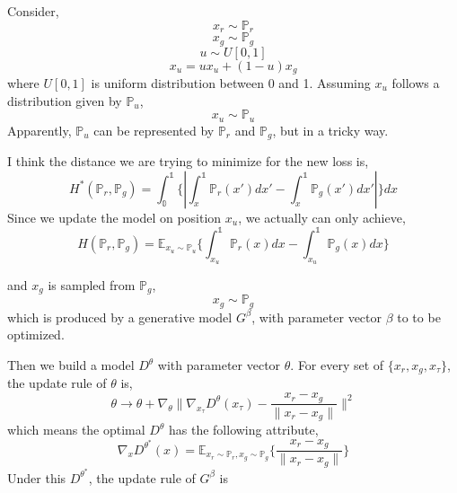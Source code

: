 \documentclass[letterpaper]{article} %
\begin{document}
Consider,
\begin{equation}\label{x-r}
   x_{r} \sim \mathbb{P}_{r}
\end{equation}
\begin{equation}\label{x-g}
  x_{g} \sim \mathbb{P}_{g}
\end{equation}
\begin{equation}\label{epsilon}
  u \sim U[0,1]
\end{equation}
\begin{equation}\label{x-epsilon}
  x_{u} = u x_{u} + (1-u) x_g
\end{equation}
where $U[0,1]$ is uniform distribution between 0 and 1. Assuming $x_{u}$ follows a distribution given by $\mathbb{P}_{u}$,
\begin{equation}\label{x-epsilon}
  x_{u} \sim \mathbb{P}_{u}
\end{equation}
Apparently, $\mathbb{P}_{u}$ can be represented by $\mathbb{P}_r$ and $\mathbb{P}_g$, but in a tricky way.

I think the distance we are trying to minimize for the new loss is,
\begin{equation}\label{S-distance}
  H^{\ast}(\mathbb{P}_r,\mathbb{P}_g)=\int_{\mathbb{0}}^{\mathbb{1}}\{ | \int_{x}^{\mathbb{1}} \mathbb{P}_r(x') d x' - \int_{x}^{\mathbb{1}} \mathbb{P}_g(x') d x' | \}dx
\end{equation}
Since we update the model on position $x_{u}$, we actually can only achieve,
\begin{equation}\label{S-distance}
  H(\mathbb{P}_r,\mathbb{P}_g)=\mathbb{E}_{x_{u}\sim\mathbb{P}_{u}}\{ \int_{x_{u}}^{\mathbb{1}} \mathbb{P}_r(x) d x - \int_{x_{u}}^{\mathbb{1}} \mathbb{P}_g(x) d x \}
\end{equation}


and $x_{g}$ is sampled from $\mathbb{P}_{g}$,
\begin{equation}\label{x-g}
  x_{g} \sim \mathbb{P}_{g}
\end{equation}
which is produced by a generative model $G^{\beta}$, with parameter vector $\beta$ to to be optimized.






Then we build a model $D^{\theta}$ with parameter vector $\theta$. For every set of $\{ x_{r}, x_{g}, x_{\tau} \}$, the update rule of $\theta$ is,
\begin{equation}\label{D-loss}
  \theta \longrightarrow \theta + \nabla_{\theta} \|\nabla_{x_{\tau}}D^{\theta}(x_{\tau})-\frac{x_{r}-x_{g}}{\|x_{r}-x_{g}\|}\|^2
\end{equation}
which means the optimal $D^{\theta}$ has the following attribute,
\begin{equation}\label{optimal-D}
  \nabla_{x}D^{\theta^{\ast}}(x) = \mathbb{E}_{x_{r} \sim \mathbb{P}_{r}, x_{g} \sim \mathbb{P}_{g}} \{ \frac{x_{r}-x_{g}}{\|x_{r}-x_{g}\|} \}
\end{equation}
Under this $D^{\theta^{\ast}}$, the update rule of $G^{\beta}$ is
\end{document}
